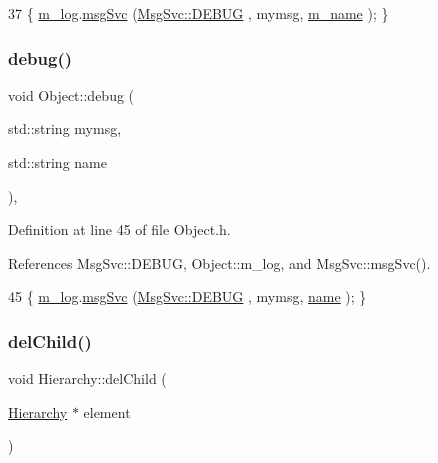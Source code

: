 \begin{DoxyCode}
37 \{ \hyperlink{classObject_a0d269813dd7ac1f24bc143031e2963f2}{m\_log}.\hyperlink{classMsgSvc_ad25f18047920cc59a314e5098259711c}{msgSvc} (\hyperlink{classMsgSvc_ae671eb7301996cd049d2da8a65925926a1dbdcc82dce88370ec335883c83b38b0}{MsgSvc::DEBUG}   , mymsg, \hyperlink{classObject_a8b83c95c705d2c3ba0d081fe1710f48d}{m\_name} ); \}
\end{DoxyCode}
\mbox{\label{classObject_a6c9a0397ca804e04d675ed05683f5420}} 
\subsubsection{\texorpdfstring{debug()}{debug()}\hspace{0.1cm}{\footnotesize\ttfamily [2/2]}}
{\footnotesize\ttfamily void Object\+::debug (\begin{DoxyParamCaption}\item[{std\+::string}]{mymsg,  }\item[{std\+::string}]{name }\end{DoxyParamCaption})\hspace{0.3cm}{\ttfamily [inline]}, {\ttfamily [inherited]}}



Definition at line 45 of file Object.\+h.



References Msg\+Svc\+::\+D\+E\+B\+UG, Object\+::m\+\_\+log, and Msg\+Svc\+::msg\+Svc().


\begin{DoxyCode}
45 \{ \hyperlink{classObject_a0d269813dd7ac1f24bc143031e2963f2}{m\_log}.\hyperlink{classMsgSvc_ad25f18047920cc59a314e5098259711c}{msgSvc} (\hyperlink{classMsgSvc_ae671eb7301996cd049d2da8a65925926a1dbdcc82dce88370ec335883c83b38b0}{MsgSvc::DEBUG}   , mymsg, \hyperlink{classObject_a300f4c05dd468c7bb8b3c968868443c1}{name} ); \}
\end{DoxyCode}
\mbox{\label{classHierarchy_a2b2b359fac003233f65786a616766bde}} 
\subsubsection{\texorpdfstring{del\+Child()}{delChild()}\hspace{0.1cm}{\footnotesize\ttfamily [1/2]}}
{\footnotesize\ttfamily void Hierarchy\+::del\+Child (\begin{DoxyParamCaption}\item[{\hyperlink{classHierarchy}{Hierarchy} $\ast$}]{element }\end{DoxyParamCaption})\hspace{0.3cm}{\ttfamily [inherited]}}



